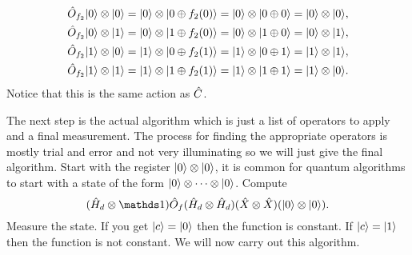     \begin{align*}
        \hat{O}_{f_2}\vert {0} \rangle\otimes\vert {0} \rangle &= \vert {0} \rangle\otimes\vert {0 \oplus f_2(0)} \rangle = \vert {0} \rangle\otimes\vert {0 \oplus 0} \rangle = \vert {0} \rangle\otimes\vert {0} \rangle,\\
        \hat{O}_{f_2}\vert {0} \rangle\otimes\vert {1} \rangle &= \vert {0} \rangle\otimes\vert {1 \oplus f_2(0)} \rangle = \vert {0} \rangle\otimes\vert {1 \oplus 0} \rangle = \vert {0} \rangle\otimes\vert {1} \rangle,\\
        \hat{O}_{f_2}\vert {1} \rangle\otimes\vert {0} \rangle &= \vert {1} \rangle\otimes\vert {0 \oplus f_2(1)} \rangle = \vert {1} \rangle\otimes\vert {0 \oplus 1} \rangle = \vert {1} \rangle\otimes\vert {1} \rangle,\\
        \hat{O}_{f_2}\vert {1} \rangle\otimes\vert {1} \rangle &= \vert {1} \rangle\otimes\vert {1 \oplus f_2(1)} \rangle = \vert {1} \rangle\otimes\vert {1 \oplus 1} \rangle = \vert {1} \rangle\otimes\vert {0} \rangle.
    \end{align*}
    Notice that this is the same action as \(\hat{C}\).
    
    The next step is the actual algorithm which is just a list of operators to apply and a final measurement.
    The process for finding the appropriate operators is mostly trial and error and not very illuminating so we will just give the final algorithm.
    Start with the register \(\vert {0} \rangle\otimes\vert {0} \rangle\), it is common for quantum algorithms to start with a state of the form \(\vert {0} \rangle\otimes\dotsb\otimes\vert {0} \rangle\).
    Compute
    \[(\operator{H}_d\tensorProd\ident)\operator{O}_{f} (\operator{H}_d\tensorProd\operator{H}_d) (\operator{X}\tensorProd\operator{X}) (\ket{0}\tensorProd\ket{0}).\]
    Measure the state.
    If you get \(\vert {c} \rangle = \vert {0} \rangle\) then the function is constant.
    If \(\vert {c} \rangle = \vert {1} \rangle\) then the function is not constant.
    We will now carry out this algorithm.
    
